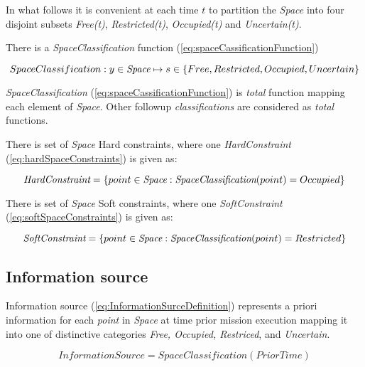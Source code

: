     \noindent In what follows it is convenient at each time $t$ to partition the \emph{Space} into four disjoint subsets \emph{Free(t)}, \emph{Restricted(t)}, \emph{Occupied(t)} and \emph{Uncertain(t)}.

    There is a \emph{SpaceClassification}  function (\ref{eq:spaceCassificationFunction})
    
    \begin{equation}\label{eq:spaceCassificationFunction}
        SpaceClassification: y \in \emph{Space} \mapsto s \in \{Free, Restricted, Occupied, Uncertain \}
    \end{equation}

    \begin{note}
        \emph{SpaceClassification} (\ref{eq:spaceCassificationFunction}) is \emph{total} function mapping each element of \emph{Space}. Other followup \emph{classifications} are considered as \emph{total} functions. 
    \end{note}

    There is set of \emph{Space} Hard constraints, where one \emph{HardConstraint} (\ref{eq:hardSpaceConstraints}) is given as:

    \begin{equation}\label{eq:hardSpaceConstraints}
        \emph{HardConstraint} = \{point \in \emph{Space}: \emph{SpaceClassification}(point) = Occupied \}
    \end{equation}

    There is set of \emph{Space} Soft constraints, where one \emph{SoftConstraint} (\ref{eq:softSpaceConstraints}) is given as:

    \begin{equation}\label{eq:softSpaceConstraints}
        \emph{SoftConstraint} = \{point \in \emph{Space}: \emph{SpaceClassification}(point) = Restricted \}
    \end{equation}

\subsection{Information source}\label{s:informationSources}
    \begin{definition}{Information source} \label{def:InformationSurceDefinition}         
        (\ref{eq:InformationSurceDefinition}) represents a priori information for each \emph{point} in \emph{Space} at time prior mission execution mapping it into one of distinctive categories \emph{Free, Occupied, Restriced}, and \emph{Uncertain}.
        
        \begin{equation}\label{eq:InformationSurceDefinition}
            InformationSource = SpaceClassification(PriorTime)
        \end{equation}
    \end{definition}


